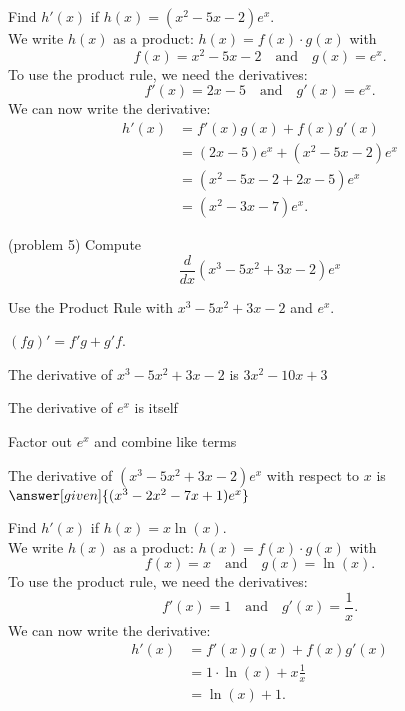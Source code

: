 \documentclass{ximera}
\begin{document}
\begin{example}[example 5]
Find $h'(x)$ if $h(x) = (x^2 - 5x - 2)e^x$.\\
We write $h(x)$ as a product: $h(x) = f(x) \cdot g(x)$ with
\[f(x) = x^2 - 5x -2 \quad \text{and} \quad g(x) = e^x.\]
To use the product rule, we need the derivatives:
\[f'(x) = 2x - 5 \quad \text{and} \quad g'(x)= e^x.\]
We can now write the derivative:
\begin{align*}
h'(x) &= f'(x)g(x) + f(x)g'(x) \\
&= (2x - 5)e^x+ (x^2 - 5x - 2)e^x  \\
&= (x^2 - 5x - 2 + 2x - 5)e^x \\
&= (x^2 - 3x - 7)e^x.
\end{align*}
\end{example}


\begin{center}
\begin{foldable}
\end{foldable}
\end{center}


\begin{problem}(problem 5)
  Compute
  \[
  \frac{d}{dx} (x^3 - 5x^2 + 3x -2)e^x
  \]
  
    \begin{hint}
      Use the Product Rule with $x^3 - 5x^2 + 3x -2$ and $e^x$.
    \end{hint}
    \begin{hint}
      $(fg)' = f'g+g'f$.
    \end{hint}
    \begin{hint}
      The derivative of $x^3 - 5x^2 + 3x -2$ is $3x^2 - 10x + 3$
    \end{hint}
    \begin{hint}
      The derivative of $e^x$ is itself
    \end{hint}
    \begin{hint}
      Factor out $e^x$ and combine like terms 
    \end{hint}
		The derivative of $(x^3 - 5x^2 + 3x -2)e^x$ with respect to $x$ is
		 $\answer[given]{(x^3 - 2x^2 - 7x +1)e^x}$
		
\end{problem}




\begin{example}[example 6]
Find $h'(x)$ if $h(x) = x\ln(x)$.\\
We write $h(x)$ as a product: $h(x) = f(x) \cdot g(x)$ with
\[f(x) = x \quad \text{and} \quad g(x) = \ln(x).\]
To use the product rule, we need the derivatives:
\[f'(x) = 1 \quad \text{and} \quad g'(x)= \frac{1}{x}.\]
We can now write the derivative:
\begin{align*}
h'(x) &= f'(x)g(x) + f(x)g'(x) \\
&=  1 \cdot \ln(x) + x\frac{1}{x}  \\
&=  \ln(x) + 1.
\end{align*}
\end{example}
\end{document}
